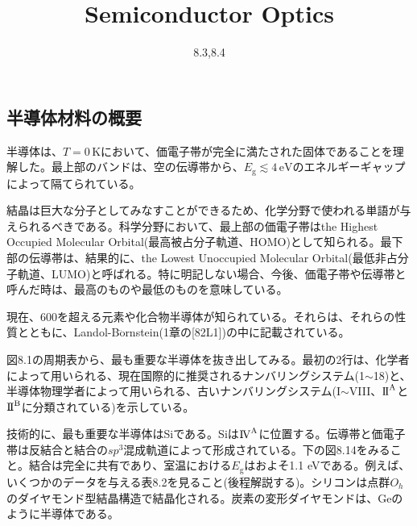 \documentclass[11pt,a4j,uplatex]{jsarticle}
\title{Semiconductor Optics}
\author{8.3,8.4}
\begin{document}
 \maketitle %

 \thispagestyle{empty}%
 \clearpage
 \addtocounter{page}{-1}


 \tableofcontents %

 \thispagestyle{empty}%
 \clearpage
 \addtocounter{page}{-1}

\fi
\setcounter{section}{8}%
\setcounter{subsection}{2}
\setcounter{figure}{0}
\newpage
\subsection{半導体材料の概要}
半導体は、$T=0\,\mathrm{K}$において、価電子帯が完全に満たされた固体であることを理解した。最上部のバンドは、空の伝導帯から、$E_{\mathrm{g}}\lesssim4\,\mathrm{eV}$のエネルギーギャップによって隔てられている。

結晶は巨大な分子としてみなすことができるため、化学分野で使われる単語が与えられるべきである。科学分野において、最上部の価電子帯はthe Highest Occupied Molecular Orbital(最高被占分子軌道、HOMO)として知られる。最下部の伝導帯は、結果的に、the Lowest Unoccupied Molecular Orbital(最低非占分子軌道、LUMO)と呼ばれる。特に明記しない場合、今後、価電子帯や伝導帯と呼んだ時は、最高のものや最低のものを意味している。

現在、600を超える元素や化合物半導体が知られている。それらは、それらの性質とともに、Landol-B$\ddot{\mathrm{o}}$rnstein(1章の[82L1])の中に記載されている。

図8.1の周期表から、最も重要な半導体を抜き出してみる。最初の2行は、化学者によって用いられる、現在国際的に推奨されるナンバリングシステム(1$\sim$18)と、半導体物理学者によって用いられる、古いナンバリングシステム(I$\sim$V\hspace{-1pt}I\hspace{-1pt}I\hspace{-1pt}I、$\mathrm{I\hspace{-1pt}I}^{\mathrm{A}}$と$\mathrm{I\hspace{-1pt}I}^{\mathrm{B}}$に分類されている)を示している。

技術的に、最も重要な半導体はSiである。Siは$\mathrm{I\hspace{-1pt}V}^{\mathrm{A}}$に位置する。伝導帯と価電子帯は反結合と結合の$sp^3$混成軌道によって形成されている。下の図8.14をみること。結合は完全に共有であり、室温における$E_{\mathrm{g}}$はおよそ1.1 eVである。例えば、いくつかのデータを与える表8.2を見ること(後程解説する)。シリコンは点群$O_h$のダイヤモンド型結晶構造で結晶化される。炭素の変形ダイヤモンドは、Geのように半導体である。
\end{document}
